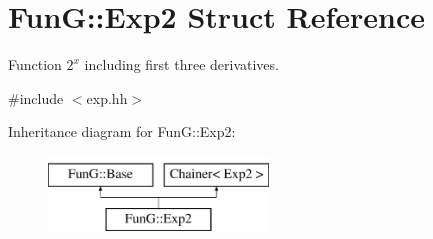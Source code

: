 \hypertarget{structFunG_1_1Exp2}{\section{Fun\-G\-:\-:Exp2 Struct Reference}
\label{structFunG_1_1Exp2}
}


Function $2^x$ including first three derivatives.  




{\ttfamily \#include $<$exp.\-hh$>$}

Inheritance diagram for Fun\-G\-:\-:Exp2\-:\begin{figure}[H]
\begin{center}
\leavevmode
\includegraphics[height=2.000000cm]{structFunG_1_1Exp2}
\end{center}
\end{figure}
